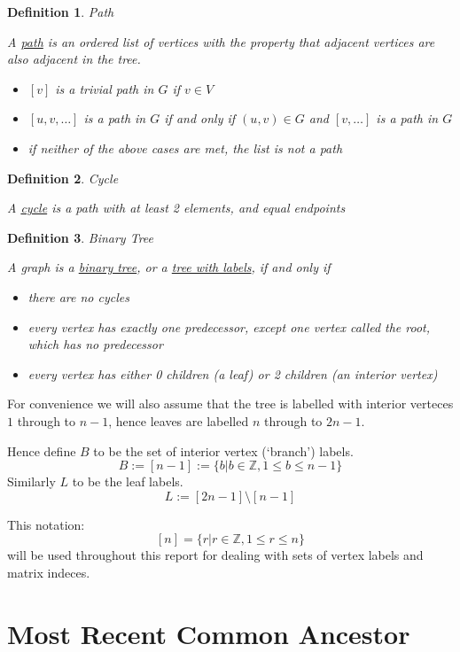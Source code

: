 \documentclass[10pt,a4paper]{report}
\newcommand{\Z}{\mathbb{Z}}
\newtheorem{definition}{Definition}
\begin{document}
\begin{definition} Path

	A \underline{path} is an ordered list of vertices with the property that adjacent
	vertices are also adjacent in the tree.

	\begin{itemize}
		\item $[v]$ is a trivial path in $G$ if $v \in V$
		\item $[u, v, \ldots]$ is a path in $G$ if and only if $(u, v) \in G$
			and $[v, \ldots]$ is a path in $G$
		\item if neither of the above cases are met, the list is not a path
	\end{itemize}
\end{definition}

\begin{definition} Cycle

	A \underline{cycle} is a path with at least 2 elements, and equal endpoints
\end{definition}

\begin{definition} Binary Tree

	A graph is a \underline{binary tree}, or a \underline{tree with labels}, if and only if
	\begin{itemize}
		\item there are no cycles
		\item every vertex has exactly one predecessor, except one vertex called
			the root, which has no predecessor
		\item every vertex has either 0 children (a leaf) or 2 children
			(an interior vertex)
	\end{itemize}
\end{definition}

For convenience we will also assume that the tree is labelled with interior verteces $1$
through to $n-1$, hence leaves are labelled $n$ through to $2n-1$.

Hence define $B$ to be the set of interior vertex (`branch') labels.
\[B := [n-1] := \{b | b \in \Z, 1 \leq b \leq n-1\}\]
Similarly $L$ to be the leaf labels.
\[L := [2n-1] \setminus [n-1]\]

This notation: \[[n] = \{r|r\in\Z, 1 \leq r \leq n\}\] will be used throughout this report for dealing with sets of vertex labels and matrix indeces.

\section{Most Recent Common Ancestor}
\end{document}
